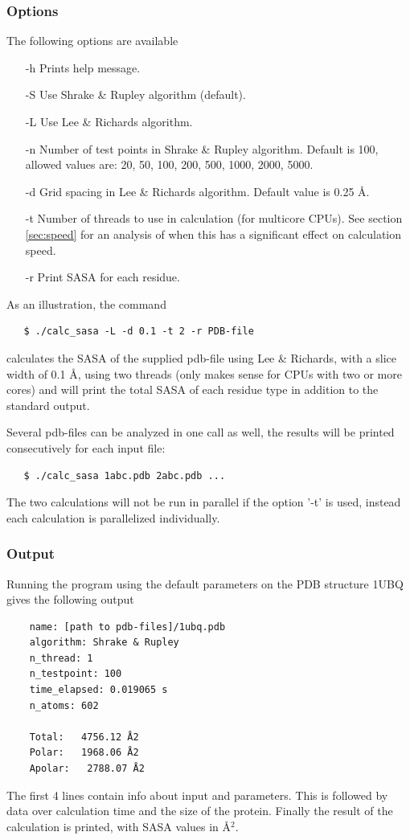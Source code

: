\documentclass[a4paper,11pt]{article}
\begin{document}
\subsubsection{Options}
The following options are available
\begin{itemize}
  \item[-h] Prints help message.
  \item[-S] Use Shrake \& Rupley algorithm (default).
  \item[-L] Use Lee \& Richards algorithm.
  \item[-n] Number of test points in Shrake \& Rupley algorithm.
    Default is 100, allowed values are: 20, 50, 100, 200, 500, 1000,
    2000, 5000.
  \item[-d] Grid spacing in Lee \& Richards algorithm.
  Default value is 0.25 Å.
  \item[-t] Number of threads to use in calculation (for multicore
    CPUs). See section \ref{sec:speed} for an analysis of when this
    has a significant effect on calculation speed.
  \item[-r] Print SASA for each residue.
\end{itemize}
As an illustration, the command
\begin{verbatim}
   $ ./calc_sasa -L -d 0.1 -t 2 -r PDB-file
\end{verbatim}
calculates the SASA of the supplied pdb-file using Lee \& Richards,
with a slice width of 0.1 Å, using two threads (only makes sense for
CPUs with two or more cores) and will print the total SASA of each
residue type in addition to the standard output.

Several pdb-files can be analyzed in one call as well, the results
will be printed consecutively for each input file:
\begin{verbatim}
   $ ./calc_sasa 1abc.pdb 2abc.pdb ...
\end{verbatim}
The two calculations will not be run in parallel if the option '-t' is
used, instead each calculation is parallelized individually.

\subsubsection{Output}
Running the program using the default parameters on the PDB structure
1UBQ gives the following output
\begin{verbatim}
    name: [path to pdb-files]/1ubq.pdb
    algorithm: Shrake & Rupley
    n_thread: 1
    n_testpoint: 100
    time_elapsed: 0.019065 s
    n_atoms: 602

    Total:   4756.12 Å2
    Polar:   1968.06 Å2
    Apolar:   2788.07 Å2
\end{verbatim}
The first 4 lines contain info about input and parameters. This is
followed by data over calculation time and the size of the
protein. Finally the result of the calculation is printed, with SASA
values in Å$^2$.
\end{document}
